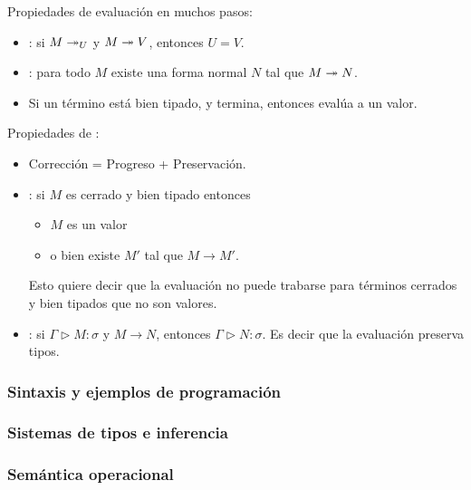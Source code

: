 Propiedades de evaluación en muchos pasos:

\begin{itemize}
  \item {}: si $M \twoheadrightarrow _U$ y $M \twoheadrightarrow V$, entonces $U=V$.
  \item {}: para todo $M$ existe una forma normal $N$ tal que $M \twoheadrightarrow N$.
  \item Si un término está bien tipado, y termina, entonces evalúa a un valor.
\end{itemize}

Propiedades de :

\begin{itemize}
  \item Corrección = Progreso + Preservación.
  \item {}: si $M$ es cerrado y bien tipado entonces
    \begin{itemize}
      \item $M$ es un valor
      \item o bien existe $M'$ tal que $M \to M'$.
    \end{itemize}
    Esto quiere decir que la evaluación no puede trabarse para términos cerrados y bien tipados que no son valores.
  \item {}: si $\Gamma \rhd M : \sigma$ y $M \to N$, entonces $\Gamma \rhd N : \sigma$. Es decir que la evaluación preserva tipos.
\end{itemize}

\subsubsection{Sintaxis y ejemplos de programación}
\subsubsection{Sistemas de tipos e inferencia}
\subsubsection{Semántica operacional}
